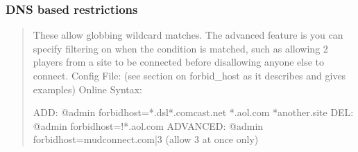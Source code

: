 \documentclass[letterpaper,10pt,english]{sphinxmanual}
\begin{document}
\begin{sphinxVerbatim}[commandchars=\\\{\}]
            
          
              
            
           
              
            
               
              
\end{sphinxVerbatim}


\subsubsection{DNS based restrictions}
\label{\detokenize{security:dns-based-restrictions}}\begin{quote}

\sphinxAtStartPar
These allow globbing wildcard matches.
The advanced feature is you can specify filtering on
when the condition is matched, such as allowing 2 players from a site to
be connected before disallowing anyone else to connect.
Config File: (see section on forbid\_host as it describes and gives examples)
Online Syntax:

\begin{sphinxVerbatim}[commandchars=\\\{\}]
ADD:      @admin forbid\PYGZus{}host=*.dsl*.comcast.net *.aol.com *another.site
DEL:      @admin forbid\PYGZus{}host=!*.aol.com
ADVANCED: @admin forbid\PYGZus{}host=mudconnect.com|3 (allow 3 at once only)
\end{sphinxVerbatim}
\end{quote}
\end{document}
